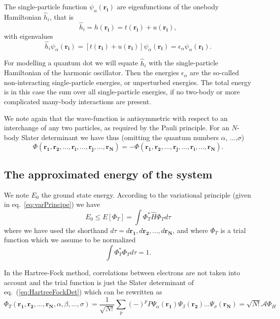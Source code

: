 The single-particle function $\psi_\alpha(\mathbf{r_i})$ are eigenfunctions of the onebody Hamiltonian $\hat{h}_i$, that is
\begin{equation}
  \nonumber
\hat{h}_i = h(\mathbf{r_i})= t(\mathbf{r_i})+u(\mathbf{r_i}),
\end{equation}
with eigenvalues
\begin{equation}
  \nonumber
\hat{h}_i \psi_\alpha( \mathbf{r_i}) =  \left[ t(\mathbf{r_i}) + u(\mathbf{r_i}) \right] \psi_\alpha(\mathbf{r_i})= \epsilon_\alpha  \psi_\alpha (\mathbf{r_i}).
\end{equation}

For modelling a quantum dot we will equate $\hat{h}_i$ with the single-particle Hamiltonian of the harmonic oscillator. Then the energies $\epsilon_\alpha$ are the so-called non-interacting single-particle energies, or unperturbed energies. The total energy is in this case the sum over all single-particle energies, if no two-body or more complicated many-body interactions are present.

We note again that the wave-function is antisymmetric with respect to an interchange of any two particles, as required by the Pauli principle. For an $N$-body Slater determinant we have thus (omitting the quantum numbers $\alpha$, $\dots$,$\sigma$)
\begin{equation}
  \nonumber
\Phi(\mathbf{r_1},\mathbf{r_2},\dots,\mathbf{r_i},\dots, \mathbf{r_j},\dots,\mathbf{r_N})=-\Phi(\mathbf{r_1},\mathbf{r_2},\dots,\mathbf{r_j},\dots, \mathbf{r_i},\dots,\mathbf{r_N}).
\end{equation}


\subsection{The approximated energy of the system}
We note $E_0$ the ground state energy. According to the variational principle (given in eq.~\ref{eq:varPrincipe}) we have
\begin{equation}
  \nonumber
E_0 \leq E[\Phi_T] = \int \Phi_T^{*} \hat{H} \Phi_T d\tau
\end{equation}
where we have used the shorthand $d\tau=d\mathbf{r_1},d\mathbf{r_2},\dots,d\mathbf{r_N}$, and where $\Phi_T$ is a trial function which we assume to be normalized
\[
\int \Phi_T^* \Phi_T d\tau=1.
\]

In the Hartree-Fock method, correlations between electrons are not taken into account and the trial function is just the Slater determinant of eq.~(\ref{eq:HartreeFockDet}) which can be rewritten as
\begin{equation}
\Phi_T(\mathbf{r_1},\mathbf{r_2},\dots,\mathbf{r_N}, \alpha, \beta, \dots, \sigma)=\frac{1}{\sqrt{N!}}\sum_p (-)^p P \Psi_\alpha(\mathbf{r_1})\Psi_\beta(\mathbf{r_2}) \dots \Psi_\sigma(\mathbf{r_N})=\sqrt{N!} \mathcal{A} \Phi_H
\end{equation}

